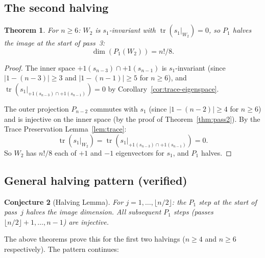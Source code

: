\documentclass[11pt]{article}
\newtheorem{theorem}{Theorem}
\newtheorem{conjecture}[theorem]{Conjecture}
\theoremstyle{definition}
\theoremstyle{remark}
\newcommand{\tr}{\operatorname{tr}}
\begin{document}
\subsection{The second halving}

\begin{theorem}
\label{thm:halving-2}
For $n \ge 6$: $W_2$ is $s_1$-invariant with $\tr(s_1|_{W_2}) = 0$,
so $P_1$ halves the image at the start of pass~3:
\[
  \dim(P_1(W_2)) = n!/8.
\]
\end{theorem}

\begin{proof}
The inner space $+1(s_{n-3}) \cap +1(s_{n-1})$ is $s_1$-invariant
(since $|1 - (n-3)| \ge 3$ and $|1 - (n-1)| \ge 5$ for $n \ge 6$),
and $\tr(s_1|_{+1(s_{n-3}) \cap +1(s_{n-1})}) = 0$ by
Corollary~\ref{cor:trace-eigenspace}.

The outer projection $P_{n-2}$ commutes with $s_1$ (since
$|1 - (n-2)| \ge 4$ for $n \ge 6$) and is injective on the inner
space (by the proof of Theorem~\ref{thm:pass2}). By the Trace
Preservation Lemma~\ref{lem:trace}:
\[
  \tr(s_1|_{W_2}) = \tr(s_1|_{+1(s_{n-3}) \cap +1(s_{n-1})}) = 0.
\]
So $W_2$ has $n!/8$ each of $+1$ and $-1$ eigenvectors for $s_1$,
and $P_1$ halves.
\end{proof}


\subsection{General halving pattern (verified)}

\begin{conjecture}[Halving Lemma]
\label{conj:halving}
For $j = 1, \dots, \lfloor n/2 \rfloor$: the $P_1$ step at the
start of pass~$j$ halves the image dimension. All subsequent $P_1$
steps (passes $\lfloor n/2 \rfloor + 1, \dots, n-1$) are injective.
\end{conjecture}

\noindent The above theorems prove this for the first two halvings
($n \ge 4$ and $n \ge 6$ respectively). The pattern continues:
\end{document}
